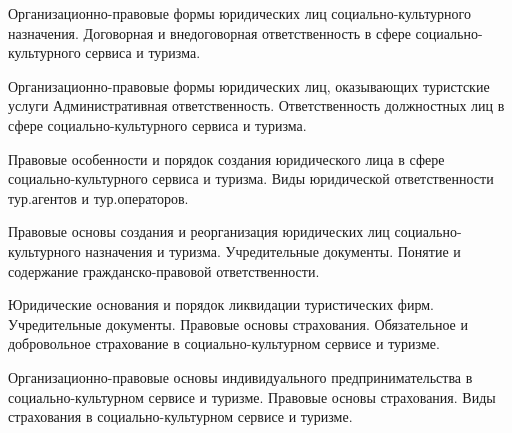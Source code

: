 \documentclass[
	14pt,
	a4paper,
	]
	{scrartcl}
\begin{document}
\vfill

\newpage


\shapk
{}
\setcounter{zad}{0}

\vfill
\z Организационно-правовые формы юридических лиц социально-культурного назначения.
 \vfill
\z Договорная и внедоговорная ответственность в сфере социально-культурного сервиса и туризма.
 \vfill

\vfill

\newpage


\shapk
{}
\setcounter{zad}{0}

\vfill
\z Организационно-правовые формы юридических лиц, оказывающих туристские услуги
 \vfill
\z Административная ответственность. Ответственность должностных лиц в сфере социально-культурного сервиса и туризма.
 \vfill

\vfill

\newpage


\shapk
{}
\setcounter{zad}{0}

\vfill
\z Правовые особенности и порядок создания юридического лица в сфере социально-культурного сервиса и туризма. 
 \vfill
\z Виды юридической ответственности тур.агентов и тур.операторов.
 \vfill

\vfill

\newpage


\shapk
{}
\setcounter{zad}{0}

\vfill
\z Правовые основы создания и реорганизация юридических лиц социально-культурного назначения и туризма. Учредительные документы.
 \vfill
\z Понятие и содержание гражданско-правовой ответственности.
 \vfill

\vfill

\newpage


\shapk
{}
\setcounter{zad}{0}

\vfill
\z Юридические основания и порядок ликвидации туристических фирм. Учредительные документы.
 \vfill
\z Правовые основы страхования. Обязательное и добровольное страхование в социально-культурном сервисе и туризме.
 \vfill

\vfill

\newpage


\shapk
{}
\setcounter{zad}{0}

\vfill
\z Организационно-правовые основы индивидуального предпринимательства в социально-культурном сервисе и туризме. 
 \vfill
\z Правовые основы страхования. Виды страхования в социально-культурном сервисе и туризме.
 \vfill
\end{document}

